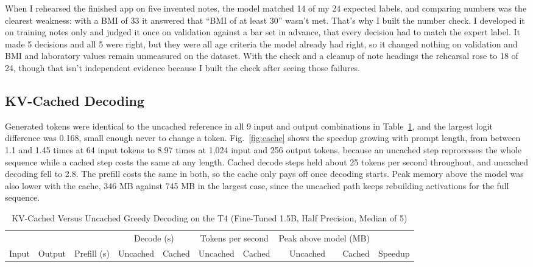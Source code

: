 \documentclass[conference]{IEEEtran}
\begin{document}
When I rehearsed the finished app on five invented notes, the model matched 14 of my 24 expected labels, and comparing numbers was the clearest weakness: with a BMI of 33 it answered that ``BMI of at least 30'' wasn't met. That's why I built the number check. I developed it on training notes only and judged it once on validation against a bar set in advance, that every decision had to match the expert label. It made 5 decisions and all 5 were right, but they were all age criteria the model already had right, so it changed nothing on validation and BMI and laboratory values remain unmeasured on the dataset. With the check and a cleanup of note headings the rehearsal rose to 18 of 24, though that isn't independent evidence because I built the check after seeing those failures.

\subsection{KV-Cached Decoding}

Generated tokens were identical to the uncached reference in all 9 input and output combinations in Table~\ref{tab:cache}, and the largest logit difference was 0.168, small enough never to change a token. Fig.~\ref{fig:cache} shows the speedup growing with prompt length, from between 1.1 and 1.45 times at 64 input tokens to 8.97 times at 1,024 input and 256 output tokens, because an uncached step reprocesses the whole sequence while a cached step costs the same at any length. Cached decode steps held about 25 tokens per second throughout, and uncached decoding fell to 2.8. The prefill costs the same in both, so the cache only pays off once decoding starts. Peak memory above the model was also lower with the cache, 346 MB against 745 MB in the largest case, since the uncached path keeps rebuilding activations for the full sequence.

\begin{table}[t]
\caption{KV-Cached Versus Uncached Greedy Decoding on the T4 (Fine-Tuned 1.5B, Half Precision, Median of 5)}
\label{tab:cache}
\centering
\footnotesize
\begin{tabular}{@{}rrrrrrrrrr@{}}
\toprule
 & & & \multicolumn{2}{c}{Decode (s)} & \multicolumn{2}{c}{Tokens per second} & \multicolumn{2}{c}{Peak above model (MB)} & \\
Input & Output & Prefill (s) & Uncached & Cached & Uncached & Cached & Uncached & Cached & Speedup \\
\midrule

\end{tabular}
\end{table}
\end{document}
